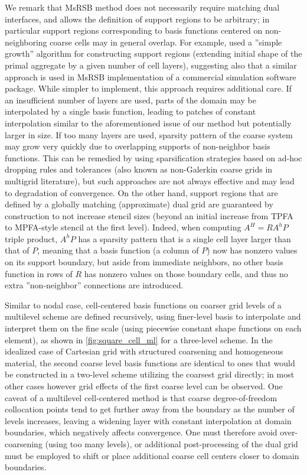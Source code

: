We remark that MsRSB method does not necessarily require matching dual interfaces, and allows the definition of support regions to be arbitrary; in particular support regions corresponding to basis functions centered on non-neighboring coarse cells may in general overlap.   For example, \cite{Klemetsdal2020} used a ''simple growth'' algorithm for constructing support regions (extending initial shape of the primal aggregate by a given number of cell layers), suggesting also that a similar approach is used in MsRSB implementation of a commercial simulation software package.   While simpler to implement, this approach requires additional care.   If an insufficient number of layers are used, parts of the domain may be interpolated by a single basis function, leading to patches of constant interpolation similar to the aforementioned issue of our method but potentially larger in size.   If too many layers are used, sparsity pattern of the coarse system may grow very quickly due to overlapping supports of non-neighbor basis functions.   This can be remedied by using sparsification strategies based on ad-hoc dropping rules and tolerances (also known as non-Galerkin coarse grids in multigrid literature), but such approaches are not always effective and may lead to degradation of convergence.   On the other hand, support regions that are defined by a globally matching (approximate) dual grid are guaranteed by construction to not increase stencil sizes (beyond an initial increase from TPFA to MPFA-style stencil at the first level).   Indeed, when computing $A^H = RA^hP$ triple product, $A^hP$ has a sparsity pattern that is a single cell layer larger than that of $P$, meaning that a basis function (a column of $P$) now has nonzero values on its support boundary, but aside from immediate neighbors, no other basis function in rows of $R$ has nonzero values on those boundary cells, and thus no extra ''non-neighbor'' connections are introduced.

Similar to nodal case, cell-centered basis functions on coarser grid levels of a multilevel scheme are defined recursively, using finer-level basis to interpolate and interpret them on the fine scale (using piecewise constant shape functions on each element), as shown in \autoref{fig:square_cell_ml} for a three-level scheme.   In the idealized case of Cartesian grid with structured coarsening and homogeneous material, the second coarse level basis functions are identical to ones that would be constructed in a two-level scheme utilizing the coarsest grid directly; in most other cases however grid effects of the first coarse level can be observed.   One caveat of a multilevel cell-centered method is that coarse degree-of-freedom collocation points tend to get further away from the boundary as the number of levels increases, leaving a widening layer with constant interpolation at domain boundaries, which negatively affects convergence.   One must therefore avoid over-coarsening (using too many levels), or additional post-processing of the dual grid must be employed to shift or place additional coarse cell centers closer to domain boundaries.

